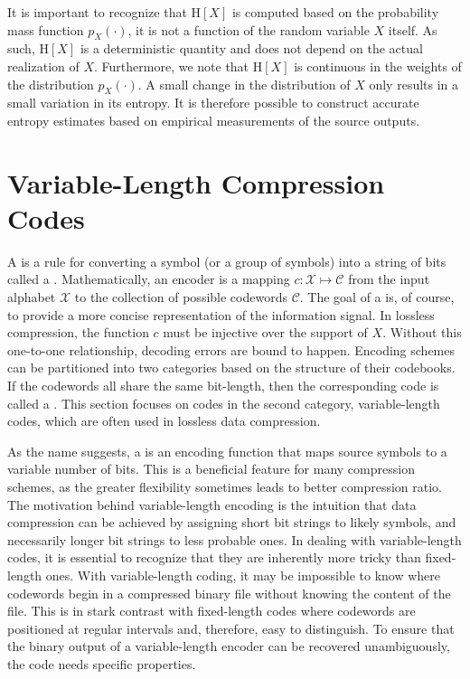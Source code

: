 It is important to recognize that $\mathrm{H}[X]$ is computed based on the probability mass function $p_X(\cdot)$, it is not a function of the random variable $X$ itself.
As such, $\mathrm{H}[X]$ is a deterministic quantity and does not depend on the actual realization of $X$.
Furthermore, we note that $\mathrm{H}[X]$ is continuous in the weights of the distribution $p_X(\cdot)$.
A small change in the distribution of $X$ only results in a small variation in its entropy.
It is therefore possible to construct accurate entropy estimates based on empirical measurements of the source outputs.


\section{Variable-Length Compression Codes}

A  is a rule for converting a symbol (or a group of symbols) into a string of bits called a .
Mathematically, an encoder is a mapping $c : \mathcal{X} \mapsto \mathcal{C}$ from the input alphabet $\mathcal{X}$ to the collection of possible codewords $\mathcal{C}$.
The goal of a  is, of course, to provide a more concise representation of the information signal.
In lossless compression, the function $c$ must be injective over the support of $X$.
Without this one-to-one relationship, decoding errors are bound to happen.
Encoding schemes can be partitioned into two categories based on the structure of their codebooks.
If the codewords all share the same bit-length, then the corresponding code is called a .
This section focuses on codes in the second category, variable-length codes, which are often used in lossless data compression.

As the name suggests, a  is an encoding function that maps source symbols to a variable number of bits.
This is a beneficial feature for many compression schemes, as the greater flexibility sometimes leads to better compression ratio.
The motivation behind variable-length encoding is the intuition that data compression can be achieved by assigning short bit strings to likely symbols, and necessarily longer bit strings to less probable ones.
In dealing with variable-length codes, it is essential to recognize that they are inherently more tricky than fixed-length ones.
With variable-length coding, it may be impossible to know where codewords begin in a compressed binary file without knowing the content of the file.
This is in stark contrast with fixed-length codes where codewords are positioned at regular intervals and, therefore, easy to distinguish.
To ensure that the binary output of a variable-length encoder can be recovered unambiguously, the code needs specific properties.

